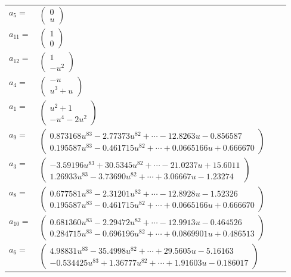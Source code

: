 \documentclass[1p]{elsarticle_modified}
\theoremstyle{definition}
\begin{document}
\begin{tabular}{m{7pt} m{180pt} m{7pt} m{180pt} }
\flushright $a_{5}=$&$\begin{pmatrix}0\\u\end{pmatrix}$ \\
\flushright $a_{11}=$&$\begin{pmatrix}1\\0\end{pmatrix}$ \\
\flushright $a_{12}=$&$\begin{pmatrix}1\\- u^2\end{pmatrix}$ \\
\flushright $a_{4}=$&$\begin{pmatrix}- u\\u^3+u\end{pmatrix}$ \\
\flushright $a_{1}=$&$\begin{pmatrix}u^2+1\\- u^4-2 u^2\end{pmatrix}$ \\
\flushright $a_{9}=$&$\begin{pmatrix}0.873168 u^{83}-2.77373 u^{82}+\cdots-12.8263 u-0.856587\\0.195587 u^{83}-0.461715 u^{82}+\cdots+0.0665166 u+0.666670\end{pmatrix}$ \\
\flushright $a_{3}=$&$\begin{pmatrix}-3.59196 u^{83}+30.5345 u^{82}+\cdots-21.0237 u+15.6011\\1.26933 u^{83}-3.73690 u^{82}+\cdots+3.06667 u-1.23274\end{pmatrix}$ \\
\flushright $a_{8}=$&$\begin{pmatrix}0.677581 u^{83}-2.31201 u^{82}+\cdots-12.8928 u-1.52326\\0.195587 u^{83}-0.461715 u^{82}+\cdots+0.0665166 u+0.666670\end{pmatrix}$ \\
\flushright $a_{10}=$&$\begin{pmatrix}0.681360 u^{83}-2.29472 u^{82}+\cdots-12.9913 u-0.464526\\0.284715 u^{83}-0.696196 u^{82}+\cdots+0.0869901 u+0.486513\end{pmatrix}$ \\
\flushright $a_{6}=$&$\begin{pmatrix}4.98831 u^{83}-35.4998 u^{82}+\cdots+29.5605 u-5.16163\\-0.534425 u^{83}+1.36777 u^{82}+\cdots+1.91603 u-0.186017\end{pmatrix}$ \\

\end{tabular}
\end{document}
